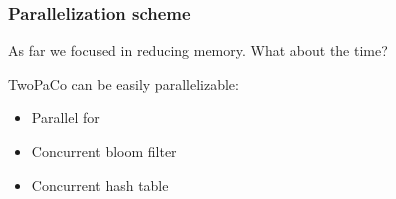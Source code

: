 
\begin{frame}
	\frametitle{Parallelization scheme}
	\centering
	
	As far we focused in reducing memory. What about the time?
	
	\medskip
	
	TwoPaCo can be easily parallelizable:
	
	\begin{itemize}
	  \item Parallel for
	  \item Concurrent bloom filter
	  \item Concurrent hash table
	\end{itemize}
	
\end{frame}
